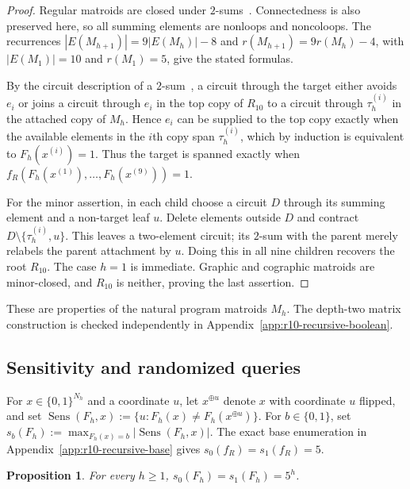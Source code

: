 \documentclass[11pt]{article}
\numberwithin{equation}{section}
\newtheorem{proposition}[definition]{Proposition}
\theoremstyle{remark}
\begin{document}
\begin{proof}
Regular matroids are closed under $2$-sums~\cite{Oxley2011}. Connectedness is
also preserved here, so all summing elements are nonloops and noncoloops.
The recurrences
$|E(M_{h+1})|=9|E(M_h)|-8$ and $r(M_{h+1})=9r(M_h)-4$, with
$|E(M_1)|=10$ and $r(M_1)=5$, give the stated formulas.

By the circuit description of a $2$-sum~\cite{Oxley2011}, a circuit through
the target either avoids $e_i$ or joins a circuit through $e_i$ in the top
copy of $R_{10}$ to a circuit through $\tau_h^{(i)}$ in the attached copy of
$M_h$. Hence $e_i$ can be supplied to the top copy exactly when the available
elements in the $i$th copy span $\tau_h^{(i)}$, which by induction is
equivalent to $F_h(x^{(i)})=1$. Thus the target is spanned exactly when
$f_R(F_h(x^{(1)}),\ldots,F_h(x^{(9)}))=1$.

For the minor assertion, in each child choose a circuit $D$ through its
summing element and a non-target leaf $u$. Delete elements outside $D$ and
contract $D\setminus\{\tau_h^{(i)},u\}$. This leaves a two-element circuit;
its $2$-sum with the parent merely relabels the parent attachment by $u$.
Doing this in all nine children recovers the root $R_{10}$. The case $h=1$
is immediate. Graphic and cographic matroids are minor-closed, and $R_{10}$
is neither, proving the last assertion.
\end{proof}

These are properties of the natural program matroids $M_h$. The depth-two
matrix construction is checked independently in
Appendix~\ref{app:r10-recursive-boolean}.

\subsection{Sensitivity and randomized queries}

For $x\in\{0,1\}^{N_h}$ and a coordinate $u$, let $x^{\oplus u}$ denote
$x$ with coordinate $u$ flipped, and set
$\operatorname{Sens}(F_h,x):=\{u:F_h(x)\neq F_h(x^{\oplus u})\}$. For
$b\in\{0,1\}$, set
$s_b(F_h):=\max_{F_h(x)=b}|\operatorname{Sens}(F_h,x)|$. The exact base
enumeration in Appendix~\ref{app:r10-recursive-base} gives
$s_0(f_R)=s_1(f_R)=5$.

\begin{proposition}
\label{prop:recursive-r10-sensitivity}
For every $h\geq1$, $s_0(F_h)=s_1(F_h)=5^h$.
\end{proposition}
\end{document}
